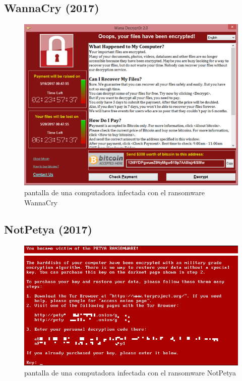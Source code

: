 \documentclass{article}
\begin{document}
\subsection{WannaCry (2017)}
\autocite{darknetdiaries-wannacry}
\autocite{doj-lazarus}
\autocite{mandiant-mannacry}


\begin{figure}[t]
    \centering
    \includegraphics[width=1.0\textwidth]{Wana_Decrypt0r.png}
    \caption{pantalla de una computadora infectada con el ransomware WannaCry}
\end{figure}

\subsection{NotPetya (2017)}

\begin{figure}[t]
    \centering
    \includegraphics[width=1.0\textwidth]{notPetya.png}
    \caption{pantalla de una computadora infectada con el ransomware NotPetya}
\end{figure}
\end{document}
